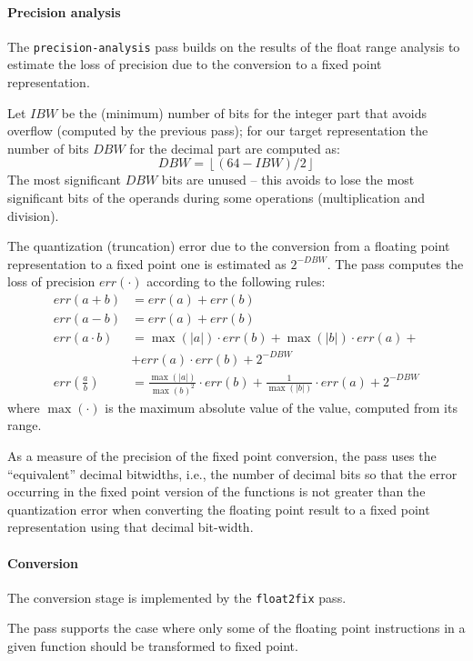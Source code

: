 \documentclass[9pt,twocolumn,a4paper]{scrartcl}
\begin{document}
\paragraph{Precision analysis} The \verb|precision-analysis| pass builds on the
results of the float range analysis to estimate the loss of precision due to
the conversion to a fixed point representation.

Let $IBW$ be the (minimum) number of bits for the integer part that avoids
overflow (computed by the previous pass); for our target representation the
number of bits $DBW$ for the decimal part are computed as:
    \[ DBW = \left\lfloor (64 - IBW) / 2 \right\rfloor \]
The most significant $DBW$ bits are unused -- this avoids to lose the most
significant bits of the operands during some operations (multiplication and
division).

The quantization (truncation) error due to the conversion from a floating point
representation to a fixed point one is estimated as $2^{-DBW}$. The pass
computes the loss of precision $err(\cdot)$ according to the following rules:
\begin{align*}
    err(a + b) &= err(a) + err(b) \\
    err(a - b) &= err(a) + err(b) \\
    err(a \cdot b) &= \max(|a|) \cdot err(b) + \max(|b|) \cdot err(a) + \\
               &  + err(a) \cdot err(b) + 2^{-DBW} \\
    err\left(\frac{a}{b}\right) &= \frac{\max(|a|)}{\max(b)^2} \cdot err(b)
                         + \frac{1}{\max(|b|)} \cdot err(a) + 2^{-DBW}
\end{align*}
where $\max(\cdot)$ is the maximum absolute value of the value, computed from
its range.

As a measure of the precision of the fixed point conversion, the pass uses the
``equivalent'' decimal bitwidths, i.e., the number of decimal bits so that the
error occurring in the fixed point version of the functions is not greater than
the quantization error when converting the floating point result to a fixed
point representation using that decimal bit-width.

\paragraph{Conversion} The conversion stage is implemented by the
\verb|float2fix| pass.

The pass supports the case where only some of the floating point instructions
in a given function should be transformed to fixed point.
\end{document}
